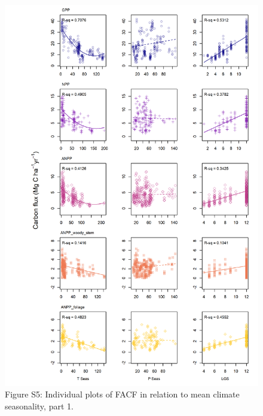 \documentclass[]{article}
\begin{document}
\begin{figure}[H]
\includegraphics[width=27.78in,height=0.95\textheight]{tables_figures/grid_plots_seasonality3} \caption{Figure S5: Individual plots of FACF in relation to mean climate seasonality, part 1.}\label{fig:unnamed-chunk-11}
\end{figure}

\newpage
\end{document}
